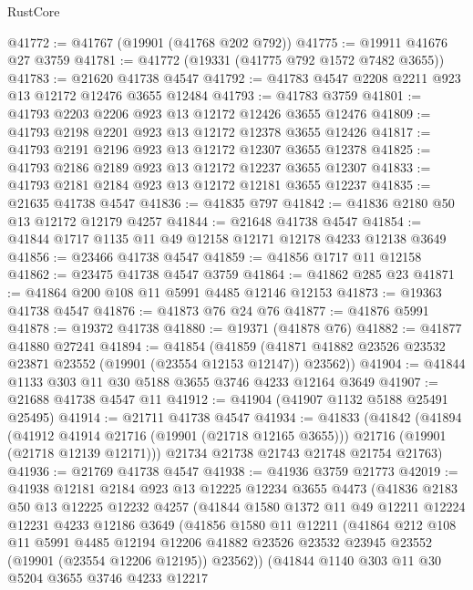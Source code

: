 \begin{lexlean}{RustCore}
\begin{coremodule}
@41772 := @41767 (@19901 (@41768 @202 @792))
@41775 := @19911 @41676 @27 @3759
@41781 := @41772 (@19331 (@41775 @792 @1572 @7482 @3655))
@41783 := @21620 @41738 @4547
@41792 := @41783 @4547 @2208 @2211 @923 @13 @12172 @12476 @3655 @12484
@41793 := @41783 @3759
@41801 := @41793 @2203 @2206 @923 @13 @12172 @12426 @3655 @12476
@41809 := @41793 @2198 @2201 @923 @13 @12172 @12378 @3655 @12426
@41817 := @41793 @2191 @2196 @923 @13 @12172 @12307 @3655 @12378
@41825 := @41793 @2186 @2189 @923 @13 @12172 @12237 @3655 @12307
@41833 := @41793 @2181 @2184 @923 @13 @12172 @12181 @3655 @12237
@41835 := @21635 @41738 @4547
@41836 := @41835 @797
@41842 := @41836 @2180 @50 @13 @12172 @12179 @4257
@41844 := @21648 @41738 @4547
@41854 := @41844 @1717 @1135 @11 @49 @12158 @12171 @12178 @4233 @12138 @3649
@41856 := @23466 @41738 @4547
@41859 := @41856 @1717 @11 @12158
@41862 := @23475 @41738 @4547 @3759
@41864 := @41862 @285 @23
@41871 := @41864 @200 @108 @11 @5991 @4485 @12146 @12153
@41873 := @19363 @41738 @4547
@41876 := @41873 @76 @24 @76
@41877 := @41876 @5991
@41878 := @19372 @41738
@41880 := @19371 (@41878 @76)
@41882 := @41877 @41880 @27241
@41894 := @41854
    (@41859 (@41871 @41882 @23526 @23532 @23871 @23552 (@19901 (@23554 @12153 @12147)) @23562))
@41904 := @41844 @1133 @303 @11 @30 @5188 @3655 @3746 @4233 @12164 @3649
@41907 := @21688 @41738 @4547 @11
@41912 := @41904 (@41907 @1132 @5188 @25491 @25495)
@41914 := @21711 @41738 @4547
@41934 := @41833
    (@41842
      (@41894
        (@41912 @41914 @21716 (@19901 (@21718 @12165 @3655)))
        @21716
        (@19901 (@21718 @12139 @12171)))
      @21734
      @21738
      @21743
      @21748
      @21754
      @21763)
@41936 := @21769 @41738 @4547
@41938 := @41936 @3759 @21773
@42019 := @41938
    @12181
    @2184
    @923
    @13
    @12225
    @12234
    @3655
    @4473
    (@41836
      @2183
      @50
      @13
      @12225
      @12232
      @4257
      (@41844
        @1580
        @1372
        @11
        @49
        @12211
        @12224
        @12231
        @4233
        @12186
        @3649
        (@41856
          @1580
          @11
          @12211
          (@41864
            @212
            @108
            @11
            @5991
            @4485
            @12194
            @12206
            @41882
            @23526
            @23532
            @23945
            @23552
            (@19901 (@23554 @12206 @12195))
            @23562))
        (@41844
          @1140
          @303
          @11
          @30
          @5204
          @3655
          @3746
          @4233
          @12217

\end{coremodule}
\end{lexlean}
